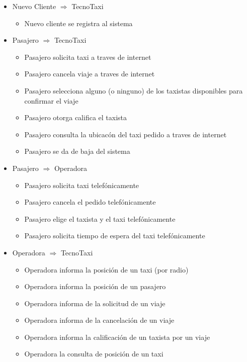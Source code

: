 \begin{itemize}

	\item Nuevo Cliente $\Rightarrow$ TecnoTaxi
	\begin{itemize}
		\item Nuevo cliente se registra al sistema
	\end{itemize}

    \item Pasajero $\Rightarrow$ TecnoTaxi
    \begin{itemize}
        \item Pasajero solicita taxi a traves de internet
        \item Pasajero cancela viaje a traves de internet
        \item Pasajero selecciona alguno (o ninguno) de los taxistas disponibles para confirmar el viaje
        \item Pasajero otorga califica el taxista
        \item Pasajero consulta la ubicac\'on del taxi pedido a traves de internet
        \item Pasajero se da de baja del sistema
    \end{itemize}

    \item Pasajero $\Rightarrow$ Operadora
    \begin{itemize}
         \item Pasajero solicita taxi telef\'onicamente
         \item Pasajero cancela el pedido telef\'onicamente
         \item Pasajero elige el taxista y el taxi telef\'onicamente
         \item Pasajero solicita tiempo de espera del taxi telef\'onicamente
    \end{itemize}

   
    \item Operadora $\Rightarrow$ TecnoTaxi
    \begin{itemize}
        \item Operadora informa la posici\'on de un taxi (por radio)
        \item Operadora informa la posici\'on de un pasajero
        \item Operadora informa de la solicitud de un viaje
        \item Operadora informa de la cancelaci\'on de un viaje
        \item Operadora informa la calificaci\'on de un taxista por un viaje
        \item Operadora la consulta de posici\'on de un taxi


\end{itemize}
\end{itemize}
